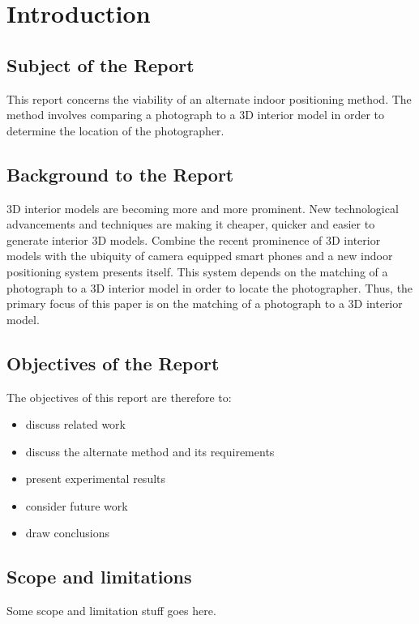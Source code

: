\documentclass[11pt,a4paper]{report}
\begin{document}
\newpage
\tableofcontents

\setcounter{page}{0}

\newpage
\chapter{Introduction}
	\section{Subject of the Report}
		This report concerns the viability of an alternate indoor positioning method. The method involves comparing a photograph to a 3D interior model in order to determine the location of the photographer.
	
	\section{Background to the Report}
		3D interior models are becoming more and more prominent. New technological advancements and techniques are making it cheaper, quicker and easier to generate interior 3D models. Combine the recent prominence of 3D interior models with the ubiquity of camera equipped smart phones and a new indoor positioning system presents itself. This system depends on the matching of a photograph to a 3D interior model in order to locate the photographer. Thus, the primary focus of this paper is on the matching of a photograph to a 3D interior model.
	
	\section{Objectives of the Report}
		The objectives of this report are therefore to:
		\begin{itemize}
			\item
				discuss related work
			\item
				discuss the alternate method and its requirements
			\item
				present experimental results
			\item
				 consider future work
			\item
				draw conclusions
		\end{itemize}
	
	\section{Scope and limitations}
		Some scope and limitation stuff goes here.
	
\end{document}
